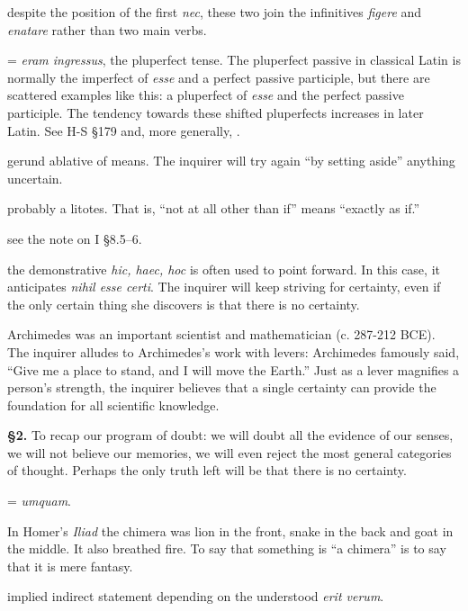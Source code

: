  despite the position of the first \textit{nec}, these two join the infinitives \textit{figere} and \textit{enatare} rather than two main verbs.

 = \textit{eram ingressus}, the pluperfect tense. The pluperfect passive in classical Latin is normally the imperfect of \textit{esse} and a perfect passive participle, but there are scattered examples like this: a pluperfect of \textit{esse} and the perfect passive participle. The tendency towards these shifted pluperfects increases in later Latin. See H-S §179 and, more generally, \cite[§298]{väänänen1981}.

 gerund ablative of means. The inquirer will try again ``by setting aside'' anything uncertain.

 probably a litotes. That is, ``not at all other than if'' means ``exactly as if.''

 see the note on I §8.5--6.

 the demonstrative \textit{hic, haec, hoc} is often used to point forward. In this case, it anticipates \textit{nihil esse certi}. The inquirer will keep striving for certainty, even if the only certain thing she discovers is that there is no certainty.

 Archimedes was an important scientist and mathematician (c. 287-212 BCE). The inquirer alludes to Archimedes's work with levers: Archimedes famously said, ``Give me a place to stand, and I will move the Earth.'' Just as a lever magnifies a person's strength, the inquirer believes that a single certainty can provide the foundation for all scientific knowledge.

\textbf{§2.} To recap our program of doubt: we will doubt all the evidence of our senses, we will not believe our memories, we will even reject the most general categories of thought. Perhaps the only truth left will be that there is no certainty.

 = \textit{umquam}.

 In Homer's \textit{Iliad} the chimera was lion in the front, snake in the back and goat in the middle. It also breathed fire. To say that something is ``a chimera'' is to say that it is mere fantasy.

 implied indirect statement depending on the understood \textit{erit verum}.

